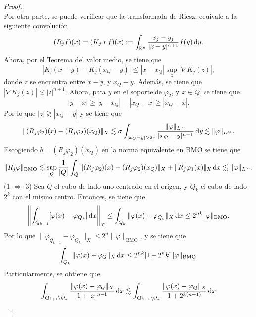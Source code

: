 \begin{proof}
\begin{equation}
	\end{equation}
	Por otra parte, se puede verificar que la transformada de Riesz, equivale a la siguiente convolución
	\begin{equation*}
		(R_jf)(x) = (K_j*f)(x) := \int_{\mathbb{R}^n} \frac{x_j-y_j}{|x-y|^{n+1}} f(y) \mathop{}\!\mathrm{d} y.
	\end{equation*}
	Ahora, por el Teorema del valor medio, se tiene que 
	\begin{equation*}
		|K_j(x-y)-K_j(x_Q-y)| \leq |x-x_Q| \sup_z |\nabla K_j(z)|,
	\end{equation*}
	donde $z$ se encuentra entre $x-y$, y $x_Q - y$. Además, se tiene que $|\nabla K_j(z)| \lesssim |z|^{n+1}$. Ahora, para $y$ en el soporte de $\varphi_2$, y $x\in Q$, se tiene que 
	\begin{equation*}
		|y-x| \geq |y-x_Q| - |x_Q-x| \geq |x_Q - x|.
	\end{equation*}
	Por lo que $|z| \gtrsim |x_Q - y|$ y se tiene que 
	\begin{equation}\label{eq:Rj-diff-L-infty}
		\|(R_j\varphi_2)(x) - (R_j\varphi_2)(x_Q)\|_X \lesssim \sigma \int_{|x_Q-y|>2\sigma} \frac{\|\varphi\|_{L^\infty}}{|x_Q - y|^{n+1}}\diff y \lesssim \|\varphi\|_{L^\infty}. 
	\end{equation}
	Escogiendo $b=(R_j\varphi_2)(x_Q)$ en la norma equivalente en $\mathrm{BMO}$ se tiene que 
	\begin{equation*}
		\|R_j\varphi\|_{\mathrm{BMO}} \lesssim \sup_Q \frac{1}{|Q|} \int_Q \|(R_j\varphi_2)(x) - (R_j\varphi_2)(x_Q)\|_X + \|R_j\varphi_1(x)\|_X \mathop{}\!\mathrm{d} x \lesssim \|\varphi\|_{L^\infty}.
	\end{equation*}
	(1 $\Rightarrow$ 3) Sea $Q$ el cubo de lado uno centrado en el origen, y $Q_k$ el cubo de lado $2^k$ con el mismo centro. Entonces, se tiene que
	\begin{equation*}
		\left\| \int_{Q_{k-1}}[\varphi(x) - \varphi_{Q_k}] \mathop{}\!\mathrm{d} x
		\right\|_X \leq \int_{Q_k} \|\varphi(x) - \varphi_{Q_k}\|_X \mathop{}\!\mathrm{d} x \leq 2^{nk}\|\varphi\|_{\mathrm{BMO}}.
	\end{equation*}
	Por lo que $\|\varphi_{Q_{k-1}} - \varphi_{Q_k}\|_X \leq 2^n\|\varphi\|_{\mathrm{BMO}}$, y se tiene que
	\begin{equation*}
		\int_{Q_k} \|\varphi(x)-\varphi_Q\|_X \mathop{}\!\mathrm{d} x \leq 2^{nk}[1+2^nk] \|\varphi\|_{\mathrm{BMO}}.
	\end{equation*}
	Particularmente, se obtiene que
	\begin{align*}
		\int_{Q_{k+1}\setminus Q_k} \frac{\|\varphi(x)-\varphi_Q\|_X}{1+|x|^{n+1}} \diff x & \lesssim \int_{Q_{k+1}\setminus Q_k} \frac{\|\varphi(x)-\varphi_Q\|_X}{1+2^{k(n+1)}} \diff x \\

\end{align*}
\end{proof}
